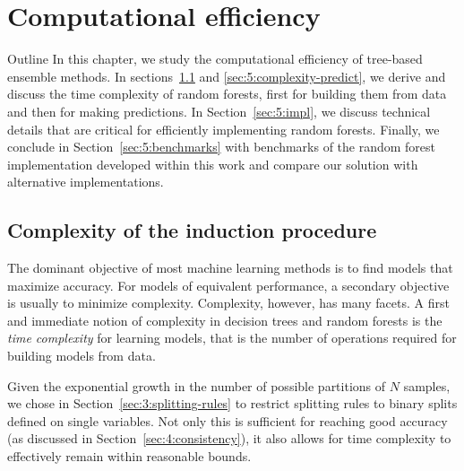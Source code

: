 \chapter{Computational efficiency}\label{ch:complexity}

\begin{remark}{Outline}
In this chapter, we study the computational efficiency of tree-based ensemble
methods. In sections~\ref{sec:5:complexity-fit} and \ref{sec:5:complexity-predict},
we derive and discuss the time complexity of random forests, first for building them from data and then for making predictions. In
Section~\ref{sec:5:impl}, we discuss technical details that are critical
for efficiently  implementing random forests. Finally, we conclude in
Section~\ref{sec:5:benchmarks} with benchmarks of the random forest implementation developed
within this work and compare our solution with alternative implementations.
\end{remark}

\section{Complexity of the induction procedure}
\label{sec:5:complexity-fit}

The dominant objective of most machine learning methods is to find models that
maximize accuracy. For models of equivalent performance, a secondary objective
is usually to minimize complexity. Complexity, however, has many facets. A
first and immediate notion of complexity in decision trees and random forests is
the \textit{time complexity} for learning models, that is the number of
operations required for building models from data.

Given the exponential growth in the number of possible partitions of $N$
samples, we chose in Section~\ref{sec:3:splitting-rules} to restrict splitting
rules to binary splits defined on single variables. Not only this is sufficient
for reaching good accuracy (as discussed in Section~\ref{sec:4:consistency}),
it also allows for time complexity to effectively remain within reasonable bounds.

